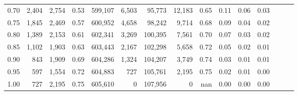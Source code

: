 \begin{tabular}{rrrrrrrrrrrrrrr}
0.70 &    2,404 &   2,754 &  0.53 &  599,107 &    6,503 &   95,773 &   12,183 &  0.65 &  0.11 &  0.06 &      0.03 \\
0.75 &    1,845 &   2,469 &  0.57 &  600,952 &    4,658 &   98,242 &    9,714 &  0.68 &  0.09 &  0.04 &      0.02 \\
0.80 &    1,389 &   2,153 &  0.61 &  602,341 &    3,269 &  100,395 &    7,561 &  0.70 &  0.07 &  0.03 &      0.02 \\
0.85 &    1,102 &   1,903 &  0.63 &  603,443 &    2,167 &  102,298 &    5,658 &  0.72 &  0.05 &  0.02 &      0.01 \\
0.90 &      843 &   1,909 &  0.69 &  604,286 &    1,324 &  104,207 &    3,749 &  0.74 &  0.03 &  0.01 &      0.01 \\
0.95 &      597 &   1,554 &  0.72 &  604,883 &      727 &  105,761 &    2,195 &  0.75 &  0.02 &  0.01 &      0.00 \\
1.00 &      727 &   2,195 &  0.75 &  605,610 &        0 &  107,956 &        0 &   nan &  0.00 &  0.00 &      0.00 \\
\bottomrule
\end{tabular}
